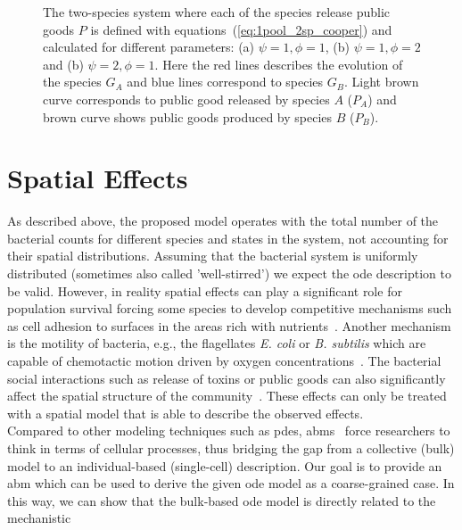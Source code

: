 \documentclass[10pt,twocolumn,5p]{elsarticle}
\numberwithin{equation}{section}
\begin{document}
\begin{figure}
\begin{center}
    \caption{
        The two-species system where each of the species release public goods $P$ is defined with equations~(\ref{eq:1pool_2sp_cooper}) and calculated for different parameters:
        (a) $\psi=1, \phi=1$, (b) $\psi=1, \phi=2$ and (b) $\psi=2, \phi=1$.
        Here the red lines describes the evolution of the species $G_A$ and blue lines correspond to species $G_B$.
        Light brown curve corresponds to public good released by species $A$ ($P_A$) and brown curve shows public goods produced by species $B$ ($P_B$).
    }
    \label{fig:1pool_2sp_cooper}
    \end{center}
\end{figure}

\section{Spatial Effects}
As described above, the proposed model operates with the total number of the bacterial counts for
different species and states in the system, not accounting for their spatial distributions.
Assuming that the bacterial system is uniformly distributed (sometimes also called 'well-stirred')
we expect the \ac{ode} description to be valid.
However, in reality spatial effects can play a significant role for population survival forcing some
species to develop competitive mechanisms such as cell adhesion to surfaces in the areas rich with
nutrients~\cite{htuson_bacteriasurface_2013}.
Another mechanism is the motility of bacteria, e.g., the flagellates \textit{E. coli} or
\textit{B. subtilis} which are capable of chemotactic motion driven by oxygen
concentrations~\cite{decoene_microscopic_2011}.
The bacterial social interactions such as release of toxins or public goods can also
significantly affect the spatial structure of the community~\cite{blanchard_bacterial_2015}.
These effects can only be treated with a spatial model that is able to describe the observed
effects.\\
Compared to other modeling techniques such as \acp{pde}, \acp{abm}~\cite{nagarajan_agent-based_2022-1} force researchers to think in
terms of cellular processes, thus bridging the gap from a
collective (bulk) model to an individual-based (single-cell) description.
Our goal is to provide an \ac{abm} which can be used to derive the given \ac{ode} model as a
coarse-grained case.
In this way, we can show that the bulk-based \ac{ode} model is directly related to the mechanistic
\end{document}
